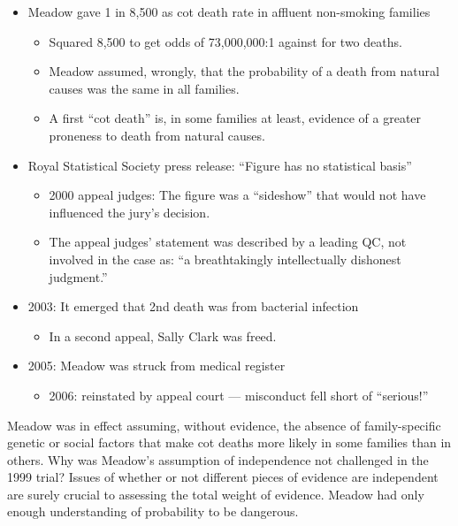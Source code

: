 \documentclass[
  10pt,
  b5paper]{book}
\providecommand{\tightlist}{%
  \setlength{\itemsep}{0pt}\setlength{\parskip}{0pt}}
\begin{document}
\begin{itemize}
\tightlist
\item
  Meadow gave 1 in 8,500 as cot death rate in affluent non-smoking families

  \begin{itemize}
  \tightlist
  \item
    Squared 8,500 to get odds of 73,000,000:1 against for two deaths.
  \item
    Meadow assumed, wrongly, that the probability of a death from
    natural causes was the same in all families.
  \item
    A first ``cot death'' is, in some families at least, evidence of a greater
    proneness to death from natural causes.
  \end{itemize}
\item
  Royal Statistical Society press release: ``Figure has no statistical basis''

  \begin{itemize}
  \tightlist
  \item
    2000 appeal judges: The figure was a
    ``sideshow'' that would not have influenced the jury's decision.
  \item
    The appeal judges' statement was described by a leading QC, not
    involved in the case as: ``a breathtakingly intellectually dishonest
    judgment.''
  \end{itemize}
\item
  2003: It emerged that 2nd death was from bacterial infection

  \begin{itemize}
  \tightlist
  \item
    In a second appeal, Sally Clark was freed.
  \end{itemize}
\item
  2005: Meadow was struck from medical register

  \begin{itemize}
  \tightlist
  \item
    2006: reinstated by appeal court --- misconduct fell short
    of ``serious!''
  \end{itemize}
\end{itemize}

Meadow was in effect assuming, without evidence, the
absence of family-specific genetic or social factors that
make cot deaths more likely in some families than in others.
Why was Meadow's assumption of independence not challenged
in the 1999 trial? Issues of whether or not different pieces
of evidence are independent are surely crucial to assessing
the total weight of evidence. Meadow had only enough
understanding of probability to be dangerous.
\end{document}
